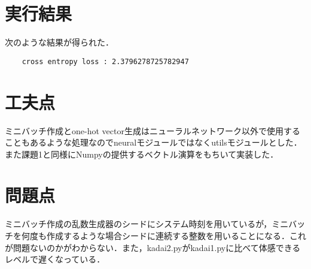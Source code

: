 \documentclass[uplatex]{jsarticle}
\begin{document}
    \section{実行結果}
    次のような結果が得られた．
    \begin{lstlisting}
    cross entropy loss : 2.3796278725782947
    \end{lstlisting}

    \section{工夫点}
    ミニバッチ作成とone-hot vector生成はニューラルネットワーク以外で使用することもあるような処理なのでneuralモジュールではなくutilsモジュールとした．また課題1と同様にNumpyの提供するベクトル演算をもちいて実装した．

    \section{問題点}
    ミニバッチ作成の乱数生成器のシードにシステム時刻を用いているが，ミニバッチを何度も作成するような場合シードに連続する整数を用いることになる．これが問題ないのかがわからない．また，kadai2.pyがkadai1.pyに比べて体感できるレベルで遅くなっている．

    
\end{document}
